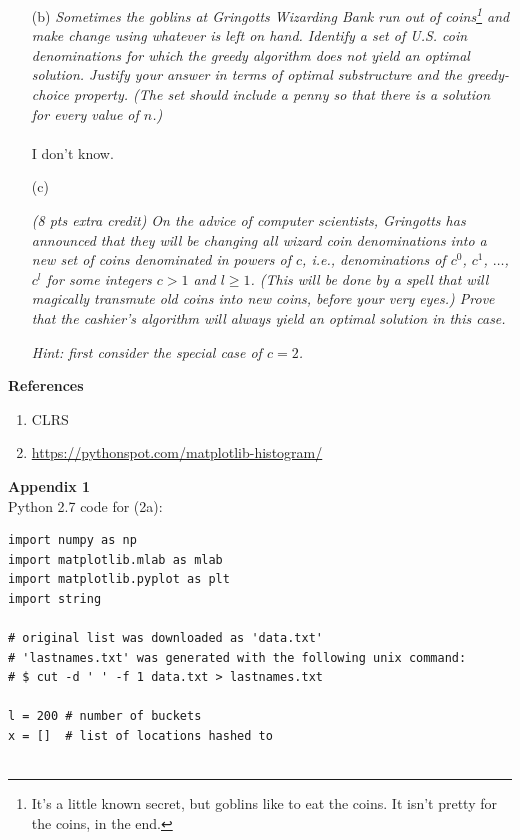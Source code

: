 \documentclass[12pt]{article} \setlength{\oddsidemargin}{0in}
\begin{document}
{\begin{enumerate}
\item[(b)]{\textit{Sometimes the goblins at Gringotts Wizarding Bank run out of coins\footnote{It's a little known secret, but goblins like to eat the coins. It isn't pretty for the coins, in the end.} and make change using whatever is left on hand. Identify a set of U.S. coin denominations
for which the greedy algorithm does not yield an optimal solution. Justify your
answer in terms of optimal substructure and the greedy-choice property. (The set
should include a penny so that there is a solution for every value of $n$.)}}
  \\\\
  I don't know.
  \\
\item[(c)]{\textit{(8 pts extra credit) On the advice of computer scientists, Gringotts has announced that they will be changing all wizard coin denominations into a new set of coins
denominated in powers of $c$, i.e., denominations of $c^0$, $c^1$, $\dots$, $c^l$ for some integers
$c > 1$ and $l \ge 1$. (This will be done by a spell that will magically transmute old
coins into new coins, before your very eyes.) Prove that the cashier's algorithm
will always yield an optimal solution in this case.}

\footnotesize{\textit{Hint: first consider the special case of $c = 2$.}}}

\end{enumerate}

\newpage

\textbf{References} \\
\hrulefill
\begin{enumerate}
  \item CLRS
  \item \url{https://pythonspot.com/matplotlib-histogram/}
\end{enumerate}

\newpage

\textbf{Appendix 1} \\
\hrulefill
Python 2.7 code for (2a): \\
\begin{verbatim}
import numpy as np
import matplotlib.mlab as mlab
import matplotlib.pyplot as plt
import string

# original list was downloaded as 'data.txt'
# 'lastnames.txt' was generated with the following unix command: 
# $ cut -d ' ' -f 1 data.txt > lastnames.txt

l = 200 # number of buckets
x = []  # list of locations hashed to


\end{verbatim}}
\end{document}
